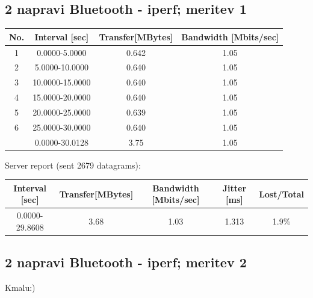 \documentclass[11pt,a4paper,slovene]{article}
\begin{document}
\subsection{2 napravi Bluetooth - iperf; meritev 1}

\begin{table}[H]
	\begin{adjustwidth}{-3cm}{-3cm}
	\centering
		\begin{tabular}{c|c|c|c}
		\hline
		\textbf{No.} & \textbf{Interval [sec]} & \textbf{Transfer[MBytes]} & \textbf{Bandwidth [Mbits/sec]}\\
     	\hline
     	1 & 0.0000-5.0000 & 0.642 & 1.05\\
  		2 & 5.0000-10.0000 & 0.640 & 1.05\\
  		3 & 10.0000-15.0000 & 0.640 & 1.05\\
  		4 & 15.0000-20.0000 & 0.640 & 1.05\\
  		5 & 20.0000-25.0000 & 0.639 & 1.05\\
  		6 & 25.0000-30.0000 & 0.640 & 1.05\\
  		& 0.0000-30.0128 & 3.75 & 1.05\\
  		\hline
    		\end{tabular}
    	\end{adjustwidth}
\end{table}

Server report (sent 2679 datagrams):\\

\begin{table}[H]
	\begin{adjustwidth}{-3cm}{-3cm}
	\centering
		\begin{tabular}{c|c|c|c|c}
		\hline
		\textbf{Interval [sec]} & \textbf{Transfer[MBytes]} & \textbf{Bandwidth [Mbits/sec]} & \textbf{Jitter [ms]} & \textbf{Lost/Total}\\
     	\hline
     	0.0000-29.8608 & 3.68 & 1.03 & 1.313 & 1.9\%\\
  		\hline
    		\end{tabular}
    	\end{adjustwidth}
\end{table}

\subsection{2 napravi Bluetooth - iperf; meritev 2}

Kmalu:)\\
\end{document}
